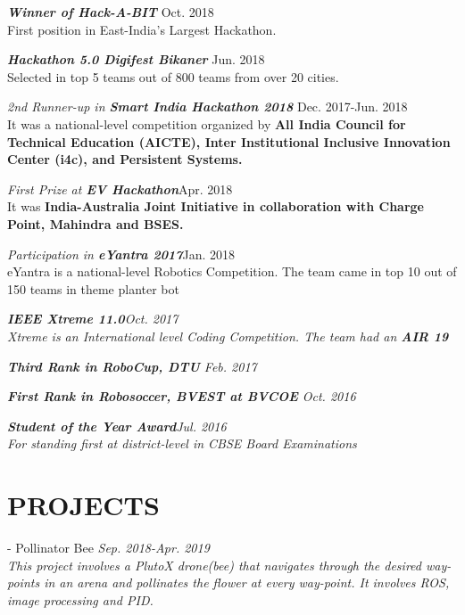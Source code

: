 \documentclass[margin, 10pt]{res} %
\begin{document}
\begin{resume}
{\sl \bf{Winner of Hack-A-BIT} } \hfill Oct. 2018\\ {\normalfont First position in East-India's Largest Hackathon.}

{\sl \bf{Hackathon 5.0 Digifest Bikaner} } \hfill Jun. 2018 \\ {\normalfont Selected in top 5 teams out of 800 teams from over 20 cities.}

{\sl 2nd Runner-up in \bf{Smart India Hackathon 2018} } \hfill{\normalfont  Dec. 2017-Jun. 2018 \\ It was a national-level competition organized by \bf{All India Council for Technical Education (AICTE), Inter Institutional Inclusive Innovation Center (i4c),} and \bf{Persistent Systems}.}

{\sl First Prize at  \bf{EV Hackathon}}\hfill {\normalfont Apr. 2018\\ It was } \bf{India-Australia Joint Initiative in collaboration with Charge Point, Mahindra and BSES.}

{\sl Participation in {\bf eYantra 2017}}\hfill {\normalfont Jan. 2018\\ eYantra is a national-level Robotics Competition. The team came in top 10 out of 150 teams in theme planter bot} 


{\sl {\bf IEEE Xtreme 11.0}\hfill{\normalfont Oct. 2017\\ Xtreme is an International level Coding Competition. The team had an {\bf AIR 19} }}

{\sl {\bf Third Rank in RoboCup, DTU}
\hfill {\normalfont Feb. 2017}}

{\sl {\bf First Rank in Robosoccer, BVEST at BVCOE}
\hfill{\normalfont Oct. 2016 }}

{\sl {\bf Student of the Year Award}\hfill{\normalfont Jul. 2016\\ For standing first at district-level in CBSE Board Examinations }}




\section{PROJECTS}

- {Pollinator Bee}
{\sl \hfill {\normalfont Sep. 2018-Apr. 2019}\\ This project involves a PlutoX drone(bee) that navigates through the desired way-points in an arena and pollinates the flower at every way-point. It involves ROS, image processing and PID.}


\end{resume}
\end{document}
